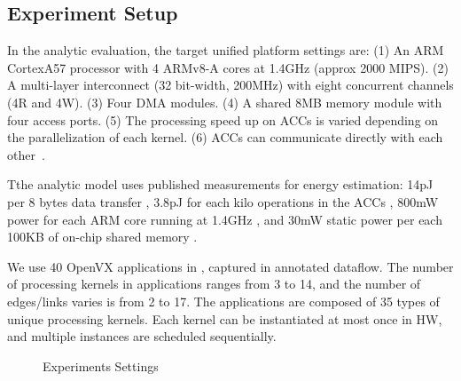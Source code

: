 \subsection{Experiment Setup}
\label{subsec:res-setup}

In the analytic evaluation, the target unified platform settings are: 
(1) An ARM CortexA57 processor with 4 ARMv8-A cores at 1.4GHz (approx 2000 MIPS).
(2) A multi-layer interconnect (32 bit-width, 200MHz) with eight concurrent channels (4R and 4W). (3) Four DMA modules. (4) A shared 8MB memory module with four access ports. (5) The processing speed up on ACCs is varied depending on the parallelization of each kernel. (6) ACCs can communicate directly with each other~\cite{teimouri2016improving}. 

Tthe analytic model uses published measurements for energy estimation: 14pJ per 8 bytes data transfer \cite{keckler2011gpus}, 3.8pJ for each kilo operations in the ACCs \cite{cong2014accelerator}, 800mW power for each ARM core running at 1.4GHz \cite{ARMcorePower}, and 30mW static power per each 100KB of on-chip shared memory \cite{malladi2012towards}.

We use 40 OpenVX applications in \cite{Intel}, \cite{AMD} captured in annotated dataflow. 
The number of processing kernels in applications ranges from 3 to 14, and the number of edges/links varies is from 2 to 17. 
The applications are composed of 35 types of unique processing kernels.
Each kernel can be instantiated at most once in HW, and multiple instances are scheduled sequentially.

\begin{figure}[h]
\vspace{-8pt}
	\centering
		\hfill
		\hfill
	\vspace{-8pt}
	\caption{Experiments Settings}
	\label{fig:avg}
\end{figure}


